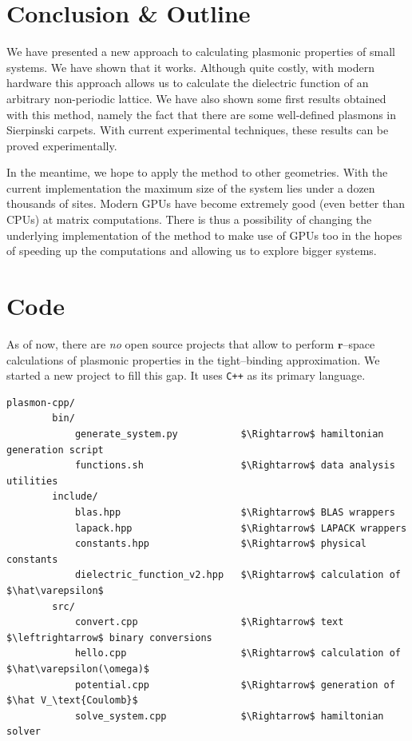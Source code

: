 \documentclass[a4paper,12pt]{article}
\begin{document}
\newpage
\section{Conclusion \& Outline}
    
    We have presented a new approach to calculating plasmonic properties of small systems. We have shown that it works. Although quite costly, with modern hardware this approach allows us to calculate the dielectric function of an arbitrary non-periodic lattice. We have also shown some first results obtained with this method, namely the fact that there are some well-defined plasmons in Sierpinski carpets. With current experimental techniques, these results can be proved experimentally.

    In the meantime, we hope to apply the method to other geometries. With the current implementation the maximum size of the system lies under a dozen thousands of sites. Modern GPUs have become extremely good (even better than CPUs) at matrix computations. There is thus a possibility of changing the underlying implementation of the method to make use of GPUs too in the hopes of speeding up the computations and allowing us to explore bigger systems.

\newpage
\appendix

\section{Code}
\label{code}

    As of now, there are \textit{no} open source projects that allow to perform $\mathbf{r}$--space calculations of plasmonic properties in the tight--binding approximation. We started a new project \cite{plasmon-cpp} to fill this gap. It uses \texttt{C++} as its primary language.

\begin{lstlisting}[mathescape]
    plasmon-cpp/
        bin/
            generate_system.py           $\Rightarrow$ hamiltonian generation script
            functions.sh                 $\Rightarrow$ data analysis utilities
        include/
            blas.hpp                     $\Rightarrow$ BLAS wrappers
            lapack.hpp                   $\Rightarrow$ LAPACK wrappers
            constants.hpp                $\Rightarrow$ physical constants
            dielectric_function_v2.hpp   $\Rightarrow$ calculation of $\hat\varepsilon$
        src/
            convert.cpp                  $\Rightarrow$ text $\leftrightarrow$ binary conversions
            hello.cpp                    $\Rightarrow$ calculation of $\hat\varepsilon(\omega)$
            potential.cpp                $\Rightarrow$ generation of $\hat V_\text{Coulomb}$
            solve_system.cpp             $\Rightarrow$ hamiltonian solver
\end{lstlisting}
\end{document}
